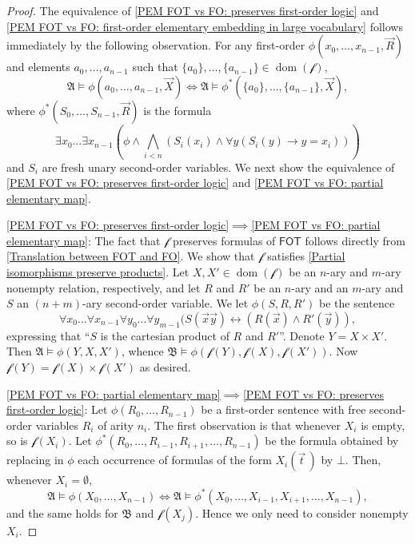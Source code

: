 \documentclass[a4paper]{amsart}
\theoremstyle{definition}
\theoremstyle{remark}
\newcommand{\A}{\mathcal{A}}
\newcommand{\B}{\mathcal{B}}
\newcommand{\vx}{\vec{x}}
\newcommand{\vy}{\vec{y}}
\DeclareMathOperator{\dom}{dom}
\newcommand\fot{\mathsf{FOT}}
\theoremstyle{definition}
\renewcommand{\A}{\mathfrak{A}}
\renewcommand{\B}{\mathfrak{B}}
\newcommand{\f}{\mathcal{f}}
\begin{document}
\begin{proof}
    The equivalence of \ref{PEM FOT vs FO: preserves first-order logic} and \ref{PEM FOT vs FO: first-order elementary embedding in large vocabulary} follows immediately by the following observation. For any first-order $\phi(x_0,\dots,x_{n-1},\vec R)$ and elements $a_0,\dots,a_{n-1}$ such that $\{a_0\},\dots,\{a_{n-1}\}\in\dom(\f)$,
    \[
        \A\models\phi(a_0,\dots,a_{n-1},\vec X) \iff \A\models\phi^*(\{a_0\},\dots,\{a_{n-1}\},\vec X),
    \]
    where $\phi^*(S_0,\dots,S_{n-1},\vec R)$ is the formula
    \[
        \exists x_0\dots\exists x_{n-1}\left(\phi \land \bigwedge_{i<n}(S_i(x_i) \land \forall y (S_i(y)\to y = x_i)) \right)
    \]
    and $S_i$ are fresh unary second-order variables. We next show the equivalence of \ref{PEM FOT vs FO: preserves first-order logic} and \ref{PEM FOT vs FO: partial elementary map}.

    \ref{PEM FOT vs FO: preserves first-order logic}$\implies$\ref{PEM FOT vs FO: partial elementary map}: The fact that $\f$ preserves formulas of $\fot$ follows directly from \cref{Translation between FOT and FO}. We show that $\f$ satisfies \ref{Partial isomorphisms preserve products}. Let $X,X'\in\dom(\f)$ be an $n$-ary and $m$-ary nonempty relation, respectively, and let $R$ and $R'$ be an $n$-ary and an $m$-ary and $S$ an $(n+m)$-ary second-order variable. We let $\phi(S,R,R')$ be the sentence
    \[
        \forall x_0\dots\forall x_{n-1}\forall y_0\dots\forall y_{m-1} (S(\vx\vy) \leftrightarrow (R(\vx)\land R'(\vy)),
    \]
    expressing that ``$S$ is the cartesian product of $R$ and $R'$''. Denote $Y=X\times X'$. Then $\A\models\phi(Y,X,X')$, whence $\B\models\phi(\f(Y),\f(X),\f(X'))$. Now $\f(Y) = \f(X)\times \f(X')$ as desired.



    

    \ref{PEM FOT vs FO: partial elementary map}$\implies$\ref{PEM FOT vs FO: preserves first-order logic}: Let $\phi(R_0,\dots,R_{n-1})$ be a first-order sentence with free second-order variables $R_i$ of arity $n_i$. The first observation is that whenever $X_i$ is empty, so is $\f(X_i)$. Let $\phi^*(R_0,\dots,R_{i-1},R_{i+1},\dots,R_{n-1})$ be the formula obtained by replacing in $\phi$ each occurrence of formulas of the form $X_i(\vec t\,)$ by $\bot$. Then, whenever $X_i=\emptyset$,
    \[
        \A\models\phi(X_0,\dots,X_{n-1}) \iff \A\models\phi^*(X_0,\dots,X_{i-1},X_{i+1},\dots,X_{n-1}),
    \]
    and the same holds for $\B$ and $\f(X_j)$.
    Hence we only need to consider nonempty $X_i$.
    

\end{proof}
\end{document}
